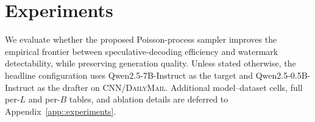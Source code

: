 %
%
%
%



\section{Experiments}
\label{sec::experiments}

We evaluate whether the proposed Poisson-process sampler improves the empirical
frontier between speculative-decoding efficiency and watermark detectability,
while preserving generation quality. Unless stated otherwise, the headline
configuration uses Qwen2.5-7B-Instruct as the target and Qwen2.5-0.5B-Instruct
as the drafter on \textsc{CNN/DailyMail}. Additional model--dataset cells, full
per-$L$ and per-$B$ tables, and ablation details are deferred to
Appendix~\ref{app::experiments}.

